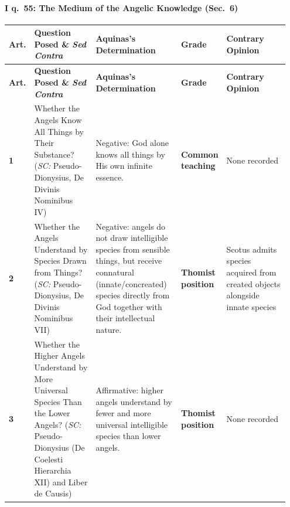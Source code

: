 \paragraph{I q.~55: The Medium of the Angelic Knowledge (Sec.~6)}
{\scriptsize
\setlength{\tabcolsep}{2.5pt}
\renewcommand{\arraystretch}{1.15}
\begin{longtable}{>{\raggedright\arraybackslash}p{0.05\linewidth}>{\raggedright\arraybackslash}p{0.23\linewidth}>{\raggedright\arraybackslash}p{0.31\linewidth}>{\raggedright\arraybackslash}p{0.12\linewidth}>{\raggedright\arraybackslash}p{0.24\linewidth}}
\toprule
\textbf{Art.} & \textbf{Question Posed \& \emph{Sed Contra}} & \textbf{Aquinas's Determination} & \textbf{Grade} & \textbf{Contrary Opinion} \\
\midrule
\endfirsthead
\toprule
\textbf{Art.} & \textbf{Question Posed \& \emph{Sed Contra}} & \textbf{Aquinas's Determination} & \textbf{Grade} & \textbf{Contrary Opinion} \\
\midrule
\endhead
\bottomrule
\endfoot
\textbf{1} & Whether the Angels Know All Things by Their Substance? (\emph{SC:} Pseudo-Dionysius, De Divinis Nominibus IV) & Negative: God alone knows all things by His own infinite essence. & \textbf{Common teaching} & None recorded \\
\addlinespace[1.5pt]
\textbf{2} & Whether the Angels Understand by Species Drawn from Things? (\emph{SC:} Pseudo-Dionysius, De Divinis Nominibus VII) & Negative: angels do not draw intelligible species from sensible things, but receive connatural (innate/concreated) species directly from God together with their intellectual nature. & \textbf{Thomist position} & Scotus admits species acquired from created objects alongside innate species \\
\addlinespace[1.5pt]
\textbf{3} & Whether the Higher Angels Understand by More Universal Species Than the Lower Angels? (\emph{SC:} Pseudo-Dionysius (De Coelesti Hierarchia XII) and Liber de Causis) & Affirmative: higher angels understand by fewer and more universal intelligible species than lower angels. & \textbf{Thomist position} & None recorded \\
\end{longtable}
}

